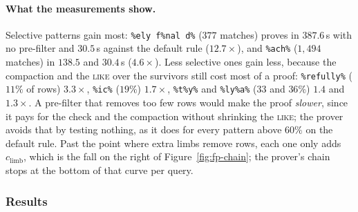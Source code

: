 \paragraph{What the measurements show.}
Selective patterns gain most: \texttt{\%ely f\%nal d\%} ($377$ matches)
proves in $387.6$\,s with no pre-filter and $30.5$\,s against the default
rule ($12.7\times$), and \texttt{\%ach\%} ($1{,}494$ matches) in $138.5$
and $30.4$\,s ($4.6\times$). Less selective ones gain less, because the
compaction and the \textsc{like} over the survivors still cost most of a
proof: \texttt{\%refully\%} ($11\%$ of rows) $3.3\times$,
\texttt{\%ic\%} ($19\%$) $1.7\times$, \texttt{\%t\%y\%} and
\texttt{\%ly\%a\%} ($33$ and $36\%$) $1.4$ and $1.3\times$. A pre-filter
that removes too few rows would make the proof \emph{slower}, since it
pays for the check and the compaction without shrinking the
\textsc{like}; the prover avoids that by testing nothing, as it does for
every pattern above $60\%$ on the default rule. Past the point where
extra limbs remove rows, each one only adds $c_{\mathrm{limb}}$, which is
the fall on the right of Figure~\ref{fig:fp-chain}; the prover's chain
stops at the bottom of that curve per query.

\subsubsection{Results}
\label{sec:fp-results}

